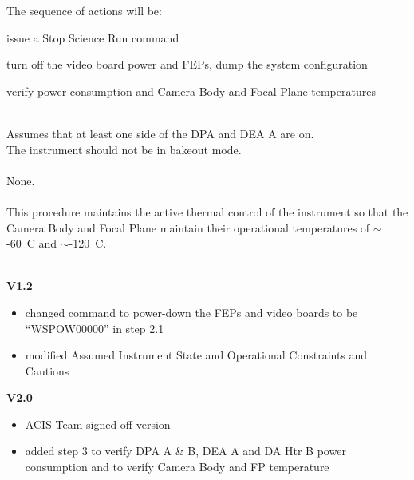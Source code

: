 \documentclass[11pt]{article}
\begin{document}
\normalsize
\vspace{0.25in}
\noindent The sequence of actions will be: 
\be
\item issue a Stop Science Run command
\vspace{-0.10in}
\item turn off the video board power and FEPs, dump the system configuration
\vspace{-0.10in}
\item verify power consumption and Camera Body and Focal Plane temperatures
\ee


\vspace{0.15in}
\normalsize
{} \\
\normalsize
Assumes that at least one side of the DPA and DEA A are on.\\
The instrument should not be in bakeout mode.\\

\normalsize
{} \\
\normalsize
None.
\\

\normalsize
{} \\
\normalsize
This procedure maintains the active thermal control of the instrument
so that the Camera Body and Focal Plane maintain their operational 
temperatures of $\sim$-60~C and $\sim$-120~C.\\

\vspace{0.15in}
\normalsize
{} \\
\normalsize

{\bf V1.2}
\begin{itemize}
\item changed command to power-down the FEPs and video boards to be
``WSPOW00000'' in step 2.1
\item modified Assumed Instrument State and Operational Constraints
and Cautions 
\end{itemize}

{\bf V2.0}
\begin{itemize}
\item ACIS Team signed-off version
\item added step 3 to verify DPA A \& B, DEA A and DA Htr B power
consumption and to verify Camera Body and FP temperature
\end{itemize}
\end{document}
